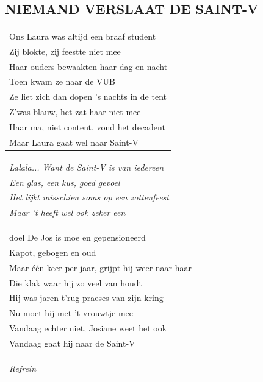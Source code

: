 \documentclass[a4paper, 14pt]{extarticle}
\begin{document}
\subsection*{NIEMAND VERSLAAT DE SAINT-V}
\begin{flushleft}
\begin{tabularx}{0.8\textwidth} {
   >{\raggedright\arraybackslash}X}
   Ons Laura was altijd een braaf student\\
Zij blokte, zij feestte niet mee\\
Haar ouders bewaakten haar dag en nacht\\
Toen kwam ze naar de VUB\\
Ze liet zich dan dopen ’s nachts in de tent\\
Z’was blauw, het zat haar niet mee\\
Haar ma, niet content, vond het decadent\\
Maar Laura gaat wel naar Saint-V\\
\end{tabularx}
\end{flushleft}\begin{flushleft}
\begin{tabularx}{0.8\textwidth} {
   >{\raggedright\arraybackslash}X}
   \textit{Lalala...}
\textit{Want de Saint-V is van iedereen}\\
\textit{Een glas, een kus, goed gevoel}\\
\textit{Het lijkt misschien soms op een zottenfeest}\\
\textit{Maar ’t heeft wel ook zeker een}\\
\end{tabularx}
\end{flushleft}\begin{flushleft}
\begin{tabularx}{0.8\textwidth} {
   >{\raggedright\arraybackslash}X}doel
De Jos is moe en gepensioneerd\\
Kapot, gebogen en oud\\
Maar één keer per jaar, grijpt hij weer naar haar\\
Die klak waar hij zo veel van houdt\\
Hij was jaren t’rug praeses van zijn kring\\
Nu moet hij met ’t vrouwtje mee\\
Vandaag echter niet, Josiane weet het ook\\
Vandaag gaat hij naar de Saint-V\\
\end{tabularx}
\end{flushleft}\begin{flushleft}
\begin{tabularx}{0.8\textwidth} {
   >{\raggedright\arraybackslash}X}
\textit{Refrein}
\end{tabularx}
\end{flushleft}
\end{document}
